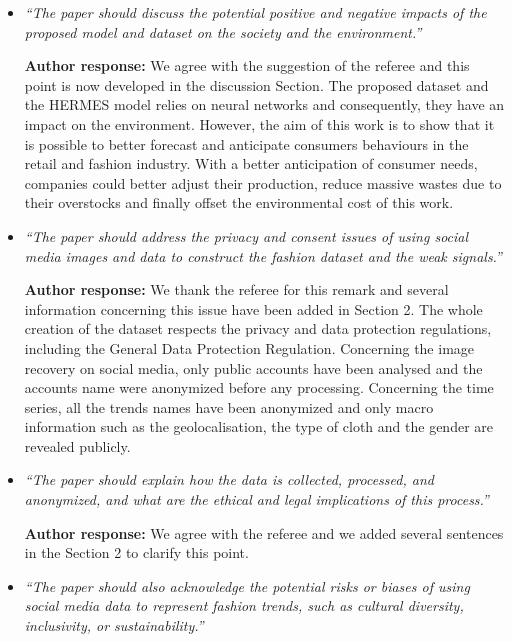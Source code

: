 \documentclass[10pt]{article} %
\begin{document}
\begin{itemize}
	\item {\em ``The paper should discuss the potential positive and negative impacts of the proposed model and dataset on the society and the environment.''} \medskip
	
	\textbf{Author response:} We agree with the suggestion of the referee and this point is now developed in the discussion Section. The proposed dataset and the HERMES model relies on neural networks and consequently, they have an impact on the environment. However, the aim of this work is to show that it is possible to better forecast and anticipate consumers behaviours in the retail and fashion industry. With a better anticipation of consumer needs, companies could better adjust their production, reduce massive wastes due to their overstocks and finally offset the environmental cost of this work.  \\
	
	\item {\em ``The paper should address the privacy and consent issues of using social media images and data to construct the fashion dataset and the weak signals.''} \medskip
	
	\textbf{Author response:} We thank the referee for this remark and several information concerning this issue have been added in Section 2. The whole creation of the dataset respects the privacy and data protection regulations, including the General Data Protection Regulation. Concerning the image recovery on social media, only public accounts have been analysed and the accounts name were anonymized before any processing. Concerning the time series, all the trends names have been anonymized and only macro information such as the geolocalisation, the type of cloth and the gender are revealed publicly.\\
	
	\item {\em ``The paper should explain how the data is collected, processed, and anonymized, and what are the ethical and legal implications of this process.''} \medskip
	
	\textbf{Author response:} We agree with the referee and  we added several sentences in the Section 2 to clarify this point. \\
	
	\item {\em ``The paper should also acknowledge the potential risks or biases of using social media data to represent fashion trends, such as cultural diversity, inclusivity, or sustainability.''} \medskip
	

\end{itemize}
\end{document}
